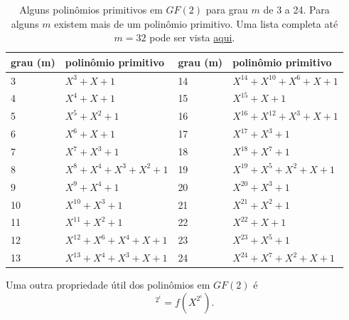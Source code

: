 \documentclass[portuguese,aspectratio=169]{beamer}
\begin{document}
\begin{frame}[allowframebreaks]
  \framebreak
  \begin{table}[h!]
    \centering
    \caption{Alguns polinômios primitivos em $GF(2)$ para grau $m$ de 3 a 24. Para alguns $m$ existem mais de um polinômio primitivo. Uma lista completa até $m=32$ pode ser vista \href{https://www.partow.net/programming/polynomials/primitive_polynomials_GF2.txt}{aqui}.}
    \begin{tabular}{llll}
        \hline
        grau (m) & polinômio primitivo & grau (m) & polinômio primitivo \\
        \hline
        \rule{0pt}{2.6ex}%
        3 & $X^3 + X + 1$ & 14 & $X^{14} + X^{10} + X^6 + X + 1$ \\
        4 & $X^4 + X + 1$ & 15 & $X^{15} + X + 1$ \\
        5 & $X^5 + X^2 + 1$ & 16 & $X^{16} + X^{12} + X^3 + X + 1$ \\
        6 & $X^6 + X + 1$ & 17 & $X^{17} + X^3 + 1$ \\
        7 & $X^7 + X^3 + 1$ & 18 & $X^{18} + X^7 + 1$ \\
        8 & $X^8 + X^4 + X^3 + X^2 + 1$ & 19 & $X^{19} + X^5 + X^2 + X + 1$ \\
        9 & $X^9 + X^4 + 1$ & 20 & $X^{20} + X^3 + 1$ \\
        10 & $X^{10} + X^3 + 1$ & 21 & $X^{21} + X^2 + 1$ \\
        11 & $X^{11} + X^2 + 1$ & 22 & $X^{22} + X + 1$ \\
        12 & $X^{12} + X^6 + X^4 + X + 1$ & 23 & $X^{23} + X^5 + 1$ \\
        13 & $X^{13} + X^4 + X^3 + X + 1$ & 24 & $X^{24} + X^7 + X^2 + X + 1$ \\
        \hline
    \end{tabular}
  \end{table}

  \framebreak
  Uma outra propriedade útil dos polinômios em $GF(2)$ é
  \begin{equation}
    [f(X)]^{2^i} = f(X^{2^i}).
  \end{equation}


\end{frame}
\end{document}
